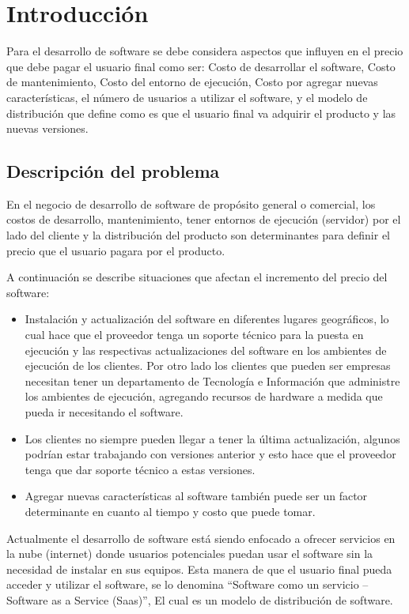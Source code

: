 \chapter{Introducción}
\noindent Para el desarrollo de software se debe considera aspectos que influyen en el precio que debe pagar el usuario final como ser: Costo de desarrollar el software, Costo de mantenimiento, Costo del entorno de ejecución,  Costo por agregar nuevas características, el número de usuarios a utilizar el software, y el modelo de distribución que define como es que el usuario final va adquirir el producto y las nuevas versiones. 

\section{Descripción del problema}
\noindent En el negocio de desarrollo de software de propósito general o comercial, los costos de desarrollo, mantenimiento, tener  entornos de ejecución (servidor) por el lado del cliente y la distribución del producto son determinantes para definir el precio que el usuario pagara por el producto.

\noindent A continuación se describe situaciones que afectan el incremento del precio del software:

\begin{itemize}
   	\item Instalación y actualización del software en diferentes lugares geográficos, lo cual hace que el proveedor tenga un soporte técnico para la puesta en ejecución y 	 las respectivas actualizaciones del software en los ambientes de ejecución de los clientes. Por otro lado los clientes que pueden ser empresas necesitan tener un departamento de Tecnología e Información que administre los ambientes de ejecución, agregando recursos de hardware a medida que pueda ir necesitando el software.
    \item Los clientes no siempre pueden llegar a tener la última actualización, algunos podrían estar trabajando con versiones anterior y esto hace que el proveedor tenga que dar soporte técnico a estas versiones.
    \item Agregar nuevas características al software también puede ser un factor determinante en cuanto al tiempo y costo que puede tomar.

\end{itemize}

\noindent Actualmente el desarrollo de software está siendo enfocado a ofrecer servicios en la nube (internet) donde usuarios potenciales puedan usar el software sin la necesidad de instalar en sus equipos. Esta manera de que el usuario final pueda acceder y utilizar el software, se lo denomina “Software como un servicio – Software as a Service (Saas)”, El cual es un modelo de distribución de software.

